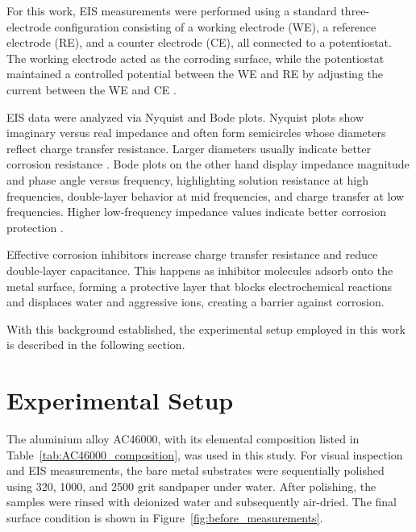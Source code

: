 \documentclass[11pt,twoside,a4paper]{report}
\begin{document}
For this work, EIS measurements were performed using a standard three-electrode configuration consisting of a working electrode (WE), a reference electrode (RE), and a counter electrode (CE), all connected to a potentiostat. The working electrode acted as the corroding surface, while the potentiostat maintained a controlled potential between the WE and RE by adjusting the current between the WE and CE \cite{Lazanas2023}.

EIS data were analyzed via Nyquist and Bode plots. Nyquist plots show imaginary versus real impedance and often form semicircles whose diameters reflect charge transfer resistance. Larger diameters usually indicate better corrosion resistance \cite{Joshua2025}. Bode plots on the other hand display impedance magnitude and phase angle versus frequency, highlighting solution resistance at high frequencies, double-layer behavior at mid frequencies, and charge transfer at low frequencies. Higher low-frequency impedance values indicate better corrosion protection \cite{Joshua2025}.

Effective corrosion inhibitors increase charge transfer resistance and reduce double-layer capacitance. This happens as inhibitor molecules adsorb onto the metal surface, forming a protective layer that blocks electrochemical reactions and displaces water and aggressive ions, creating a barrier against corrosion.

With this background established, the experimental setup employed in this work is described in the following section.

\section{Experimental Setup}

The aluminium alloy AC46000, with its elemental composition listed in Table~\ref{tab:AC46000_composition}, was used in this study. For visual inspection and EIS measurements, the bare metal substrates were sequentially polished using 320, 1000, and 2500 grit sandpaper under water. After polishing, the samples were rinsed with deionized water and subsequently air-dried. The final surface condition is shown in Figure~\ref{fig:before_measurements}.
\end{document}
